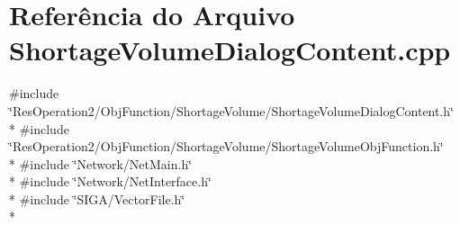 \section{Referência do Arquivo Shortage\+Volume\+Dialog\+Content.\+cpp}
\label{_2_obj_function_2_shortage_volume_2_shortage_volume_dialog_content_8cpp}
{\ttfamily \#include \char`\"{}Res\+Operation2/\+Obj\+Function/\+Shortage\+Volume/\+Shortage\+Volume\+Dialog\+Content.\+h\char`\"{}}\\*
{\ttfamily \#include \char`\"{}Res\+Operation2/\+Obj\+Function/\+Shortage\+Volume/\+Shortage\+Volume\+Obj\+Function.\+h\char`\"{}}\\*
{\ttfamily \#include \char`\"{}Network/\+Net\+Main.\+h\char`\"{}}\\*
{\ttfamily \#include \char`\"{}Network/\+Net\+Interface.\+h\char`\"{}}\\*
{\ttfamily \#include \char`\"{}S\+I\+G\+A/\+Vector\+File.\+h\char`\"{}}\\*
